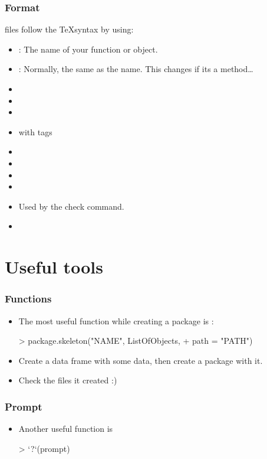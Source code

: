 \begin{frame}[allowframebreaks]
  \frametitle{Format}
   files follow the \TeX syntax by using: 
  \begin{itemize}
  \item {}: The name of your function or object.
  \item {}: Normally, the same as the name. This changes if its a method\ldots
  \item {}
  \item {}
  \item {}
  \item {}  with  tags
  \item {}
  \item {}
  \item {}
  \item {}
  \item {} Used by the check command.
  \item {}
  \end{itemize}
\end{frame}

\section{Useful tools}

\begin{frame}
  \frametitle{Functions}
  \begin{itemize}
  \item The most useful function while creating a package is :
\begin{Schunk}
\begin{Sinput}
> package.skeleton("NAME", ListOfObjects, 
+     path = "PATH")
\end{Sinput}
\end{Schunk}
  \item Create a data frame with some data, then create a package with it.
  \item Check the files it created :)
  \end{itemize}
\end{frame}

\begin{frame}
  \frametitle{Prompt}
  \begin{itemize}
  \item Another useful function is 
\begin{Schunk}
\begin{Sinput}
> `?`(prompt)
\end{Sinput}
\end{Schunk}
  \end{itemize}
\end{frame}

